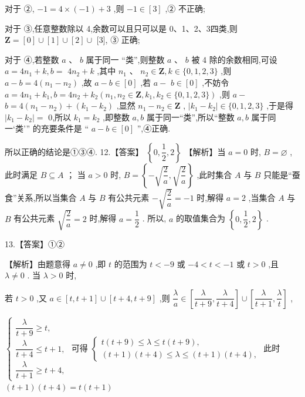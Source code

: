 \documentclass[10pt]{article}
\begin{document}
对于 ②, $- 1 = 4 \times  \left( {-1}\right)  + 3$ ,则 $- 1 \in  \left\lbrack  3\right\rbrack$ ,② 不正确;

对于 ③,任意整数除以 4,余数可以且只可以是 0、1、2、3四类,则 $\mathbf{Z} = \left\lbrack  0\right\rbrack   \cup  \left\lbrack  1\right\rbrack   \cup  \left\lbrack  2\right\rbrack   \cup$ [3], ③ 正确;

对于 ④,若整数 $a\text{ 、 }b$ 属于同一 “类”,则整数 $a\text{ 、 }b$ 被 4 除的余数相同,可设 $a = 4{n}_{1} + k,b =$  $4{n}_{2} + k$ ,其中 ${n}_{1}$ 、 ${n}_{2} \in  \mathbf{Z},k \in  \{ 0,1,2,3\}$ ,则 $a - b = 4\left( {{n}_{1} - {n}_{2}}\right)$ ,故 $a - b \in  \left\lbrack  0\right\rbrack$ ,若 $a -$  $b \in  \left\lbrack  0\right\rbrack$ ,不妨令 $a = 4{n}_{1} + {k}_{1},b = 4{n}_{2} + {k}_{2}\left( {{n}_{1},{n}_{2} \in  \mathbf{Z},{k}_{1},{k}_{2} \in  \{ 0,1,2,3\} }\right)$ ,则 $a -$  $b = 4\left( {{n}_{1} - {n}_{2}}\right)  + \left( {{k}_{1} - {k}_{2}}\right)$ ,显然 ${n}_{1} - {n}_{2} \in  \mathbf{Z}$ , $\left| {{k}_{1} - {k}_{2}}\right|  \in  \{ 0,1,2,3\}$ ,于是得 $\left| {{k}_{1} - {k}_{2}}\right|  =$ 0,所以 ${k}_{1} = {k}_{2}$ ,即整数 $a,b$ 属于同一“类”,所以“整数 $a,b$ 属于同一‘类’” 的充要条件是 “ $a - b \in  \left\lbrack  0\right\rbrack$ ”,④正确.

所以正确的结论是①③④. 12.【答案】 $\left\{  {0,\dfrac{1}{2},2}\right\}$ 【解析】当 $a = 0$ 时, $B = \varnothing$ ,此时满足 $B \subseteq  A$ ； 当 $a > 0$ 时, $B = \left\{  {-\sqrt{\dfrac{2}{a}},\sqrt{\dfrac{2}{a}}}\right\}$ ,此时集合 $A$ 与 $B$ 只能是“蚕食”关系,所以当集合 $A$ 与 $B$ 有公共元素 $- \sqrt{\dfrac{2}{a}} =  - 1$ 时,解得 $a = 2$ ,当集合 $A$ 与 $B$ 有公共元素 $\sqrt{\dfrac{2}{a}} = 2$ 时,解得 $a = \dfrac{1}{2}$ . 所以, $a$ 的取值集合为 $\left\{  {0,\dfrac{1}{2},2}\right\}$ .

13.【答案】①②

【解析】由题意得 $a \neq  0$ ,即 $t$ 的范围为 $t <  - 9$ 或 $- 4 < t <  - 1$ 或 $t > 0$ ,且 $\lambda  \neq  0$ . 当 $\lambda  > 0$ 时,

若 $t > 0$ ,又 $a \in  \left\lbrack  {t,t + 1}\right\rbrack   \cup  \left\lbrack  {t + 4,t + 9}\right\rbrack$ ,则 $\dfrac{\lambda }{a} \in  \left\lbrack  {\dfrac{\lambda }{t + 9},\dfrac{\lambda }{t + 4}}\right\rbrack   \cup  \left\lbrack  {\dfrac{\lambda }{t + 1},\dfrac{\lambda }{t}}\right\rbrack$ ,

$\left\{  \begin{array}{l} \dfrac{\lambda }{t + 9} \geq  t, \\  \dfrac{\lambda }{t + 4} \leq  t + 1, \\  \dfrac{\lambda }{t + 1} \geq  t + 4, \end{array}\right.$ 可得 $\left\{  \begin{array}{l} t\left( {t + 9}\right)  \leq  \lambda  \leq  t\left( {t + 9}\right) , \\  \left( {t + 1}\right) \left( {t + 4}\right)  \leq  \lambda  \leq  \left( {t + 1}\right) \left( {t + 4}\right) , \end{array}\right.$ 此时 $\left( {t + 1}\right) \left( {t + 4}\right)  = t\left( {t + 1}\right)$
\end{document}
